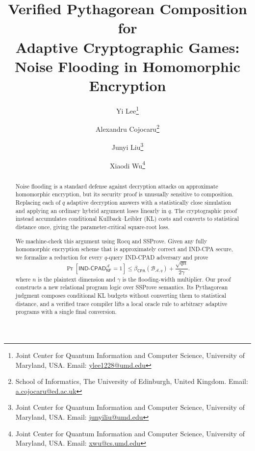 \documentclass[11pt]{article}
\title{Verified Pythagorean Composition for \\ Adaptive Cryptographic Games:\\
Noise Flooding in Homomorphic Encryption}
\author{
Yi Lee\thanks{Joint Center for Quantum Information and Computer Science, University of Maryland, USA. Email: \url{ylee1228@umd.edu}} 
\and
Alexandru Cojocaru\thanks{School of Informatics, The University of Edinburgh, United Kingdom. Email: \url{a.cojocaru@ed.ac.uk}}
\and
Junyi Liu\thanks{Joint Center for Quantum Information and Computer Science, University of Maryland, USA. Email: \url{junyiliu@umd.edu}}
\and
Xiaodi Wu\thanks{Joint Center for Quantum Information and Computer Science, University of Maryland, USA. Email: \url{xwu@cs.umd.edu}}
}
\date{}
\theoremstyle{definition}
\theoremstyle{definition}
\begin{document}
\maketitle

\begin{abstract}
Noise flooding is a standard defense against decryption attacks on approximate
homomorphic encryption, but its security proof is unusually sensitive to
composition.
Replacing each of \(q\) adaptive decryption answers with a
statistically close simulation and applying an ordinary hybrid argument loses
linearly in \(q\).
The cryptographic proof instead accumulates conditional
Kullback--Leibler (KL) costs and converts to statistical distance once, giving
the parameter-critical square-root loss.

We machine-check this argument using Rocq and SSProve.
Given any fully homomorphic encryption scheme that is approximately correct and IND-CPA secure,
we formalize a reduction for every \(q\)-query IND-CPAD adversary and prove
\[
 \Pr[\mathsf{IND\text{-}CPAD}_{\mathsf{NF}}^{\mathcal A}=1]
 \leq \beta_{\mathsf{CPA}}(\mathcal B_{\mathcal A,q})
       + \frac{\sqrt{qn}}{2\gamma}.
\]
where \(n\) is the plaintext dimension and \(\gamma\) is the flooding-width
multiplier.
Our proof constructs a new relational program logic
over SSProve semantics.
Its Pythagorean judgment composes
conditional KL budgets without converting them to statistical distance, and a
verified trace compiler lifts a local oracle rule to arbitrary adaptive
programs with a single final conversion.
\end{abstract}













%

\label{page:main-matter-end}





 


\appendix






\end{document}
